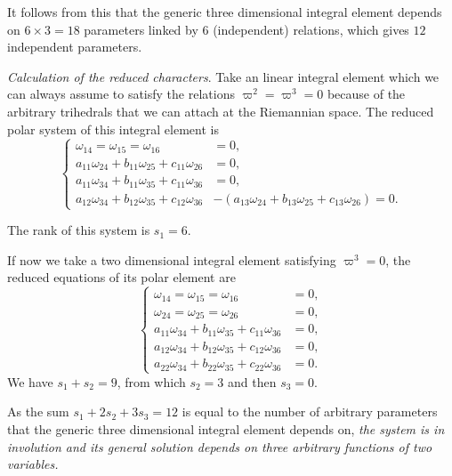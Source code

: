 \documentclass[leqno,11pt]{book}
\numberwithin{equation}{chapter}
\theoremstyle{shape1}
\theoremstyle{shape0}
\theoremstyle{shape2}
\theoremstyle{definition}
\begin{document}
It follows from this that the generic three dimensional integral element depends on $6\times 3=18$ parameters linked by $6$ (independent) relations, which gives $12$ independent parameters.

\vspace{12pt}\fsec \emph{Calculation of the reduced characters}. Take an linear integral element which we can always assume to satisfy the relations $\varpi^{2}=\varpi^{3}=0$ because of the arbitrary trihedrals that we can attach at the Riemannian space. The reduced polar system of this integral element is
\begin{equation}
  \label{eq:8.IV.10}\tag{IV, 10}
  \left\{
    \begin{aligned}
      \omega_{14}=\omega_{15}=\omega_{16}&=0,\\
      a_{11}\omega_{24}+b_{11}\omega_{25}+c_{11}\omega_{26}&=0,\\
      a_{11}\omega_{34}+b_{11}\omega_{35}+c_{11}\omega_{36}&=0,\\
      a_{12}\omega_{34}+b_{12}\omega_{35}+c_{12}\omega_{36}&-(a_{13}\omega_{24}+b_{13}\omega_{25}+c_{13}\omega_{26})=0.     
    \end{aligned}
  \right.
\end{equation}

The rank of this system is $s_{1}=6$.

If now we take a two dimensional integral element satisfying $\varpi^{3}=0$, the reduced equations of its polar element are
\begin{equation}
  \label{eq:8.IV.11}\tag{IV, 11}
  \left\{
    \begin{aligned}
      \omega_{14}=\omega_{15}=\omega_{16}&=0,\\
      \omega_{24}=\omega_{25}=\omega_{26}&=0,\\
      a_{11}\omega_{34}+b_{11}\omega_{35}+c_{11}\omega_{36}&=0,\\
      a_{12}\omega_{34}+b_{12}\omega_{35}+c_{12}\omega_{36}&=0,\\
      a_{22}\omega_{34}+b_{22}\omega_{35}+c_{22}\omega_{36}&=0.
    \end{aligned}
  \right.
\end{equation}
We have $s_{1}+s_{2}=9$, from which $s_{2}=3$ and then $s_{3}=0$.

As the sum $s_{1}+2s_{2}+3s_{3}=12$ is equal to the number of arbitrary parameters that the generic three dimensional integral element depends on, \emph{the system is in involution and its general solution depends on three arbitrary functions of two variables.}
\end{document}
